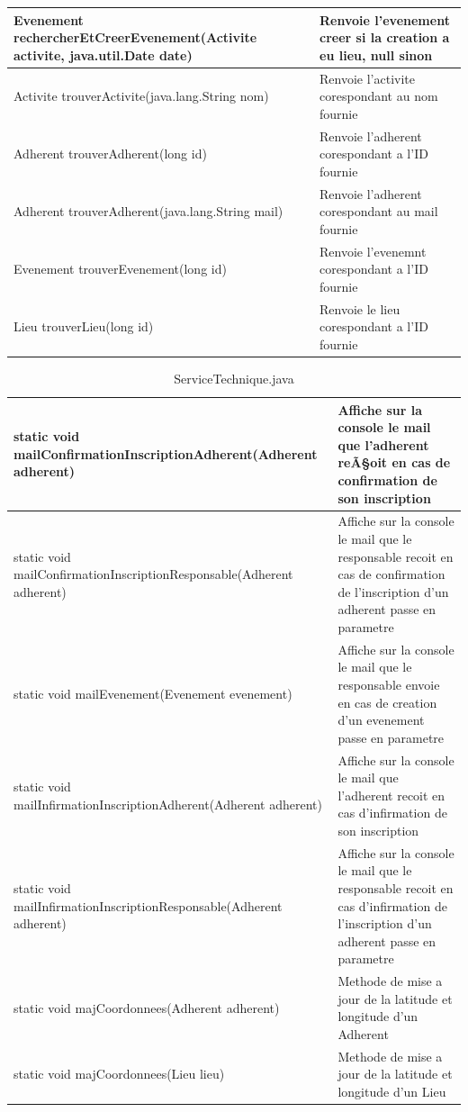 \documentclass[a4paper,11pt]{article}
\begin{document}
\begin{table}[H]
\begin{center}
\begin{longtable}{|P{7cm}|p{7cm}|}
       Evenement rechercherEtCreerEvenement(Activite activite, java.util.Date date) & Renvoie l'evenement creer si la creation a eu lieu, null sinon  \\ \hline
       Activite trouverActivite(java.lang.String nom) & Renvoie l'activite corespondant au nom fournie  \\ \hline
       Adherent trouverAdherent(long id) & Renvoie l'adherent corespondant a l'ID fournie  \\ \hline
       Adherent trouverAdherent(java.lang.String mail) & Renvoie l'adherent corespondant au mail fournie  \\ \hline
       Evenement trouverEvenement(long id) & Renvoie l'evenemnt corespondant a l'ID fournie  \\ \hline
       Lieu trouverLieu(long id) & Renvoie le lieu corespondant a l'ID fournie \\ \hline
    \end{longtable}
  \end{center}
\end{table}

\begin{table}[H]
  \caption{ServiceTechnique.java}
  \label{tab:ServiceTechnique}

  \begin{center}
    \begin{tabular}{|P{7cm}|p{7cm}|}
    \hline
       static void mailConfirmationInscriptionAdherent(Adherent adherent) & Affiche sur la console le mail que l'adherent reÃ§oit en cas de confirmation de son inscription \\ \hline
       static void mailConfirmationInscriptionResponsable(Adherent adherent) & Affiche sur la console le mail que le responsable recoit en cas de confirmation de l'inscription d'un adherent passe en parametre \\ \hline
       static void mailEvenement(Evenement evenement) & Affiche sur la console le mail que le responsable envoie en cas de creation d'un evenement passe en parametre \\ \hline
static void mailInfirmationInscriptionAdherent(Adherent adherent) & Affiche sur la console le mail que l'adherent recoit en cas d'infirmation de son inscription \\ \hline
static void mailInfirmationInscriptionResponsable(Adherent adherent) & Affiche sur la console le mail que le responsable recoit en cas d'infirmation de l'inscription d'un adherent passe en parametre \\ \hline
static void majCoordonnees(Adherent adherent) & Methode de mise a jour de la latitude et longitude d'un Adherent \\ \hline
static void majCoordonnees(Lieu lieu) & Methode de mise a jour de la latitude et longitude d'un Lieu \\ \hline
    \end{tabular}
  \end{center}
\end{table}
\end{document}
